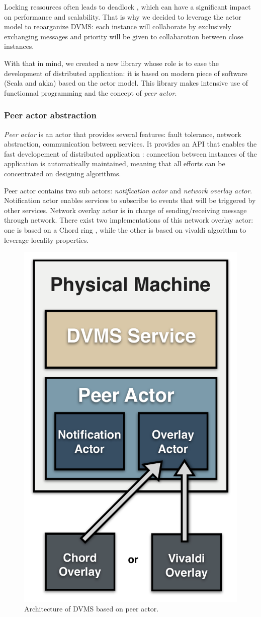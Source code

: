 Locking ressources often leads to deadlock \cite{agha:1986}, which can have
a significant impact on performance and scalability. That is why we decided to
leverage the actor model to reoarganize DVMS: each instance will collaborate
by exclusively exchanging messages and priority will be given to collabarotion
between close instances.

With that in mind, we created a new library whose role is to ease the
development of distributed application: it is based on modern piece of software (Scala and akka) based on the actor model. This library makes intensive use of
functionnal programming and the concept of \emph{peer actor}.

\subsubsection{Peer actor abstraction}

\emph{Peer actor} is an actor that provides several features: fault tolerance,
network abstraction, communication between services. It provides an API that 
enables the fast developement of distributed application : connection between
instances of the application is automatically maintained, meaning that all 
efforts can be concentrated on designing algorithms.

Peer actor contains two sub actors: \emph{notification actor} and \emph{network
overlay actor}. Notification actor enables services to subscribe to events that
will be triggered by other services. Network overlay actor is in charge of 
sending/receiving message through network. There exist two implementations of 
this network overlay actor: one is based on a Chord ring \cite{stoica2001chord}, while the other is 
based on vivaldi algorithm to leverage locality properties.

\begin{figure}[h!]
  \centering
  \includegraphics[width=0.5\linewidth]{Figures/DVMS.pdf}
  \caption{Architecture of DVMS based on peer actor.}%
  \label{fig:isp}%
\end{figure}

